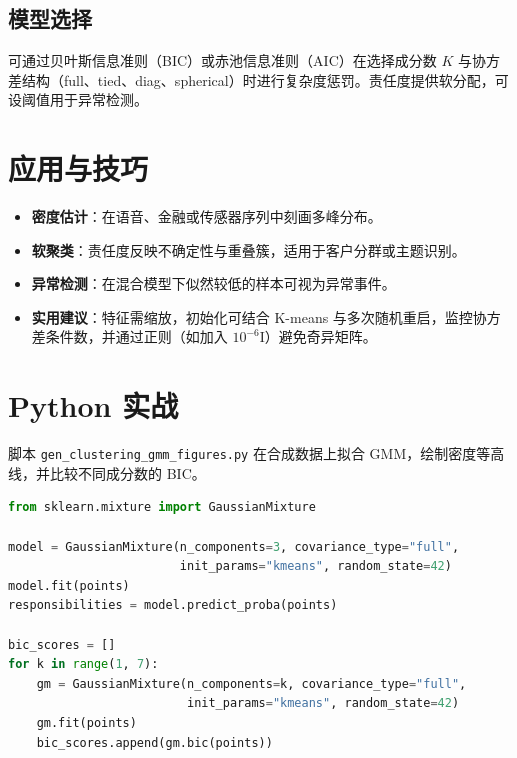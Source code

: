 \documentclass[UTF8,zihao=-4]{ctexart}
\begin{document}
\subsection{模型选择}
可通过贝叶斯信息准则（BIC）或赤池信息准则（AIC）在选择成分数 \(K\) 与协方差结构（full、tied、diag、spherical）时进行复杂度惩罚。责任度提供软分配，可设阈值用于异常检测。

\section{应用与技巧}
\begin{itemize}
  \item \textbf{密度估计}：在语音、金融或传感器序列中刻画多峰分布。
  \item \textbf{软聚类}：责任度反映不确定性与重叠簇，适用于客户分群或主题识别。
  \item \textbf{异常检测}：在混合模型下似然较低的样本可视为异常事件。
  \item \textbf{实用建议}：特征需缩放，初始化可结合 K-means 与多次随机重启，监控协方差条件数，并通过正则（如加入 \(10^{-6}\)I）避免奇异矩阵。
\end{itemize}

\section{Python 实战}
脚本 \texttt{gen\_clustering\_gmm\_figures.py} 在合成数据上拟合 GMM，绘制密度等高线，并比较不同成分数的 BIC。
\begin{lstlisting}[language=Python,caption={脚本 gen_clustering_gmm_figures.py 片段}]
from sklearn.mixture import GaussianMixture

model = GaussianMixture(n_components=3, covariance_type="full",
                        init_params="kmeans", random_state=42)
model.fit(points)
responsibilities = model.predict_proba(points)

bic_scores = []
for k in range(1, 7):
    gm = GaussianMixture(n_components=k, covariance_type="full",
                         init_params="kmeans", random_state=42)
    gm.fit(points)
    bic_scores.append(gm.bic(points))
\end{lstlisting}
\end{document}
